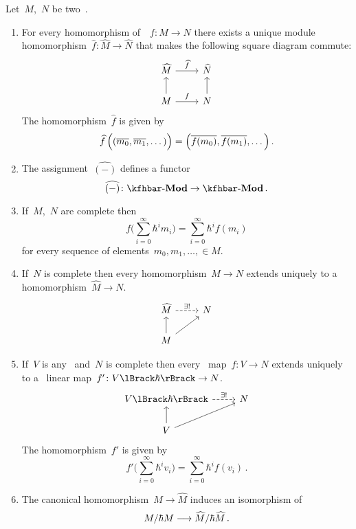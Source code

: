 \documentclass[a4paper, 11pt, oneside]{scrartcl}
\begin{document}
\begin{proposition}
  Let~$M$,~$N$ be two~\modules{$\kfhbar$}.
  \begin{enumerate}
    \item
      For every homomorphism of~\module{$\kfhbar$}~$f \colon M \to N$ there exists a unique module homomorphism~$\widehat{f} \colon \widehat{M} \to \widehat{N}$ that makes the following square diagram commute:
      \[
        \begin{tikzcd}
          \widehat{M}
          \arrow{r}[above]{\widehat{f}}
          &
          \widehat{N}
          \\
          M
          \arrow{u}
          \arrow{r}[above]{f}
          &
          N
          \arrow{u}
        \end{tikzcd}
      \]
      The homomorphism~$\widehat{f}$ is given by
      \[
        \widehat{f} \, \Bigl( (\overline{m_0}, \overline{m_1}, \dotsc) \Bigr)
        =
        \Bigl( \overline{f(m_0)}, \overline{f(m_1)}, \dotsc \Bigr) \,.
      \]
    \item
      The assignment~$\widehat{(-)}$ defines a functor
      \[
        \widehat{(-)}
        \colon
        \Mod{\kfhbar}
        \to
        \Mod{\kfhbar} \,.
      \]
    \item
      If~$M$,~$N$ are complete then
      \[
        f\Biggl( \sum_{i=0}^\infty \hbar^i m_i \Biggr)
        =
        \sum_{i=0}^\infty \hbar^i f(m_i)
      \]
      for every sequence of elements~$m_0, m_1, \dotsc, \in M$.
    \item
      If~$N$ is complete then every homomorphism~$M \to N$ extends uniquely to a homomorphism~$\widehat{M} \to N$.
      \[
        \begin{tikzcd}
          \widehat{M}
          \arrow[dashed]{r}[above]{\exists!}
          &
          N
          \\
          M
          \arrow{u}
          \arrow{ur}
          &
          {}
        \end{tikzcd}
      \]
    \item
      If~$V$ is any~\vectorspace{$\kf$} and~$N$ is complete then every~\linear{$\kf$} map~$f \colon V \to N$ extends uniquely to a~\linear{$\kfhbar$} linear map~$f' \colon \power{V}{\hbar} \to N$.
      \[
        \begin{tikzcd}
          \power{V}{\hbar}
          \arrow[dashed]{r}[above]{\exists!}
          &
          N
          \\
          V
          \arrow{u}
          \arrow{ur}
          &
          {}
        \end{tikzcd}
      \]
      The homomorphism~$f'$ is given by
      \[
        f'\Biggl( \sum_{i=0}^\infty \hbar^i v_i \Biggr)
        =
        \sum_{i=0}^\infty \hbar^i f(v_i) \,.
      \]
    \item
      The canonical homomorphism~$M \to \widehat{M}$ induces an isomorphism of~\vectorspaces{$\kf$}
      \[
        M / \hbar M
        \longrightarrow
        \widehat{M} / \hbar \widehat{M} \,.
      \]
  \end{enumerate}
\end{proposition}
\end{document}
